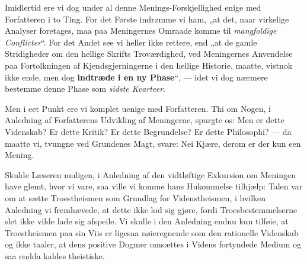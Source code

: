 \documentclass[12pt,a4paper]{book}
\newcommand{\opage}[1]{\marginnote{\footnotesize\textit{[#1]}}}
\begin{document}
\opage{87}\setcounter{footnote}{0}%
Imidlertid ere vi dog under al denne Menings-Forskjellighed
enige med Forfatteren i to Ting. For
det Første indrømme vi ham, „at det, naar virkelige
Analyser foretages, maa paa Meningernes Omraade
komme til \emph{mangfoldige Conflicter}“. For det Andet
see vi heller ikke rettere, end „at de gamle Stridigheder
om den hellige Skrifts Troværdighed, ved Meningernes
Anvendelse paa Fortolkningen af Kjendsgjerningerne i
den hellige Historie, maatte, vistnok ikke ende, men dog
\textbf{indtræde i en ny Phase}“, --- idet vi dog nærmere
bestemme denne Phase som \emph{sidste Kvarteer}.

Men i eet Punkt ere vi komplet uenige med Forfatteren.
Thi om Nogen, i Anledning af Forfatterens
Udvikling af Meningerne, spurgte os: Men er dette
Videnskab? Er dette Kritik? Er dette Begrundelse?
Er dette Philosophi? --- da maatte vi, tvungne ved
Grundenes Magt, svare: Nei Kjære, derom er der kun
een Mening.

Skulde Læseren muligen, i Anledning af den vidtløftige
Exkursion om Meningen have glemt, hvor vi
vare, saa ville vi komme hans Hukommelse tilhjælp:
Talen var om at sætte Troestheismen som Grundlag
for Videnstheismen, i hvilken Anledning vi fremhævede,
at dette ikke lod sig gjøre, fordi Troesbestemmelserne slet
ikke vilde lade sig afspeile. Vi skulle i den Anledning
endnu kun tilføie, at Troestheismen paa sin Viis er
ligesaa nøieregnende som den rationelle Videnskab og
ikke taaler, at dens positive Dogmer omsættes i Videns
fortyndede Medium og saa endda kaldes theistiske.
\end{document}
